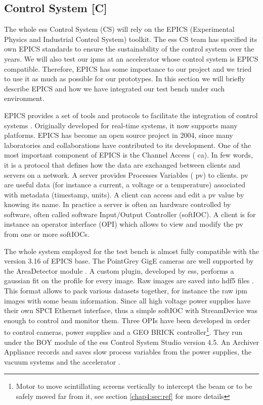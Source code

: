 \begin{refsection}
  

  \subsection{Control System [C]}
  The whole \acrshort{ess} Control System (CS) will rely on the EPICS (Experimental Physics and Industrial Control System) toolkit. The \acrshort{ess} CS team has specified its own EPICS standards to ensure the sustainability of the control system over the years. We will also test our \acrshort{ipm}s at an accelerator whose control system is EPICS compatible. Therefore, EPICS has some importance to our project and we tried to use it as much as possible for our prototypes. In this section we will briefly describe EPICS and how we have integrated our test bench under such environment.

  EPICS provides a set of tools and protocols to facilitate the integration of control systems \cite{epics2019}. Originally developed for real-time systems, it now supports many platforms. EPICS has become an open source project in 2004, since many laboratories and collaborations have contributed to its development.
  One of the most important component of EPICS is the Channel Access ( \acrshort{ca}). In few words, it is a protocol that defines how the data are exchanged between clients and servers on a network. A server provides Processes Variables ( \acrshort{pv}) to clients. \acrshort{pv} are useful data (for instance a current, a voltage or a temperature) associated with metadata (timestamp, units). A client can access and edit a \acrshort{pv} value by knowing its name. In practice a server is often an hardware controlled by software, often called software Input/Output Controller (softIOC). A client is for instance an operator interface (OPI) which allows to view and modify the \acrshort{pv} from one or more softIOCs.

  The whole system employed for the test bench is almost fully compatible with the version 3.16 of EPICS base. The PointGrey GigE cameras are well supported by the AreaDetector module \cite{ad2019}. A custom plugin, developed by \acrshort{ess}, performs a gaussian fit on the profile for every image. Raw images are saved into \acrshort{hdf}5 files \cite{hdf5}. This format allows to pack various datasets together, for instance the raw \acrshort{ipm} images with some beam information.
  Since all high voltage power supplies have their own SPCI Ethernet interface, thus a simple softIOC with StreamDevice\cite{streamdevice2019} was enough to control and monitor them.
  Three OPIs have been developed in order to control cameras, power supplies and a GEO BRICK controller\footnote{Motor to move scintillating screens vertically to intercept the beam or to be safely moved far from it, see section \ref{chap4:sec:ref} for more details}. They run under the BOY module of the \acrshort{ess} Control System Studio version 4.5. An Archiver Appliance records and saves slow process variables from the power supplies, the vacuum systems and the accelerator \cite{archiver2019}.


\end{refsection}
